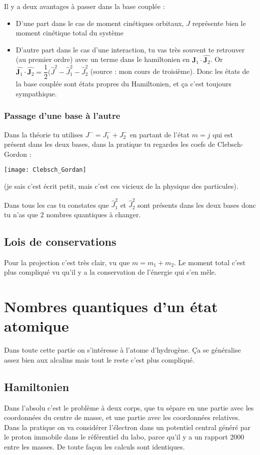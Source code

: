 \documentclass[a4paper]{report}
\begin{document}
Il y a deux avantages à passer dans la base couplée : 
\begin{itemize}
\item D'une part dans le cas de moment cinétiques orbitaux, $J$ représente bien le moment cinétique total du système
\item D'autre part dans le cas d'une interaction, tu vas très souvent te retrouver (au premier ordre) avec un terme dans le hamiltonien en $\hat{\bm J_1} \cdot \hat{\bm J_2}$. Or $\hat{\bm J_1} \cdot \hat{\bm J_2}= \dfrac{1}{2}(\hat J^2- \hat J_1^2 - \hat J_2^2$ (source : mon cours de troisième). Donc les états de la base couplée sont états propres du Hamiltonien, et ça c'est toujours sympathique.
\end{itemize}

\subsubsection{Passage d'une base à l'autre}

Dans la théorie tu utilises $J^-=J_1^-+J_2^-$ en partant de l'état $m=j$ qui est présent dans les deux bases, dans la pratique tu regardes les coefs de Clebsch-Gordon : 

\begin{center}
\texttt{[image: Clebsch\_Gordan]}
\end{center}

(je sais c'est écrit petit, mais c'est ces vicieux de la physique des particules).

Dans tous les cas tu constates que $\hat J_1^2$ et $\hat J_2^2$ sont présents dans les deux bases donc tu n'as que 2 nombres quantiques à changer.

\subsection{Lois de conservations}

Pour la projection c'est très clair, vu que $m=m_1+m_2$. Le moment total c'est plus compliqué vu qu'il y a la conservation de l'énergie qui s'en mêle.

\section{Nombres quantiques d'un état atomique}
Dans toute cette partie on s’intéresse à l'atome d'hydrogène. Ça se généralise assez bien aux alcalins mais tout le reste c'est plus compliqué.
\subsection{Hamiltonien}
Dans l'absolu c'est le problème à deux corps, que tu sépare en une partie avec les coordonnées du centre de masse, et une partie avec les coordonnées relatives. Dans la pratique on va considérer l'électron dans un potentiel central généré par le proton immobile dans le référentiel du labo, parce qu'il y a un rapport 2000 entre les masses. De toute façon les calculs sont identiques.
\end{document}

